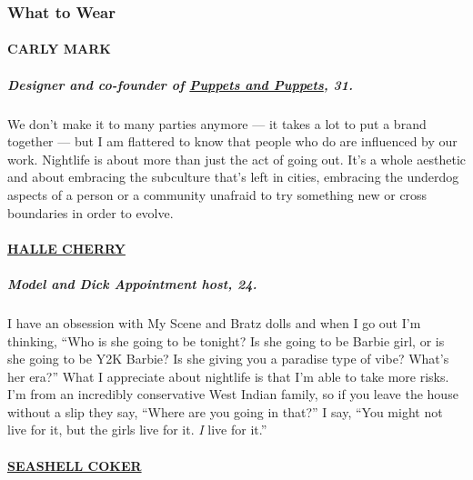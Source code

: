 \hypertarget{what-to-wear}{%
\subsubsection{What to Wear}\label{what-to-wear}}

\hypertarget{carly-mark}{%
\paragraph{CARLY MARK}\label{carly-mark}}

\hypertarget{designer-and-co-founder-of-puppets-and-puppets-31}{%
\subparagraph{\texorpdfstring{\textbf{Designer and co-founder of}
\textbf{\href{https://www.instagram.com/puppetsandpuppets/?hl=en}{Puppets
and Puppets},
31.}}{Designer and co-founder of Puppets and Puppets, 31.}}\label{designer-and-co-founder-of-puppets-and-puppets-31}}

We don't make it to many parties anymore --- it takes a lot to put a
brand together --- but I am flattered to know that people who do are
influenced by our work. Nightlife is about more than just the act of
going out. It's a whole aesthetic and about embracing the subculture
that's left in cities, embracing the underdog aspects of a person or a
community unafraid to try something new or cross boundaries in order to
evolve.

\hypertarget{halle-cherry}{%
\paragraph{\texorpdfstring{\href{https://www.instagram.com/hallecherry/?hl=en}{HALLE
CHERRY}}{HALLE CHERRY}}\label{halle-cherry}}

\hypertarget{model-and-dick-appointment-host-24}{%
\subparagraph{\texorpdfstring{\textbf{Model and Dick Appointment host,
24.}}{Model and Dick Appointment host, 24.}}\label{model-and-dick-appointment-host-24}}

I have an obsession with My Scene and Bratz dolls and when I go out I'm
thinking, ``Who is she going to be tonight? Is she going to be Barbie
girl, or is she going to be Y2K Barbie? Is she giving you a paradise
type of vibe? What's her era?'' What I appreciate about nightlife is
that I'm able to take more risks. I'm from an incredibly conservative
West Indian family, so if you leave the house without a slip they say,
``Where are you going in that?'' I say, ``You might not live for it, but
the girls live for it. \emph{I} live for it.''

\hypertarget{seashell-coker}{%
\paragraph{\texorpdfstring{\href{https://www.instagram.com/sleepy.angel/?hl=en}{SEASHELL
COKER}}{SEASHELL COKER}}\label{seashell-coker}}

